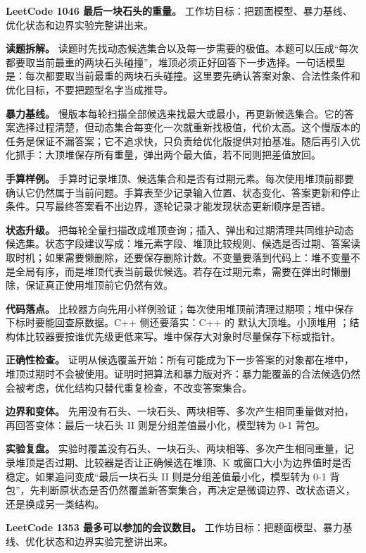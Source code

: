 \noindent\textbf{LeetCode 1046 最后一块石头的重量。} 工作坊目标：把题面模型、暴力基线、优化状态和边界实验完整讲出来。

\textbf{读题拆解。} 读题时先找动态候选集合以及每一步需要的极值。本题可以压成“每次都要取当前最重的两块石头碰撞”，堆顶必须正好回答下一步选择。一句话模型是：每次都要取当前最重的两块石头碰撞。这里要先确认答案对象、合法性条件和优化目标，不要把题型名字当成推导。

\textbf{暴力基线。} 慢版本每轮扫描全部候选来找最大或最小，再更新候选集合。它的答案选择过程清楚，但动态集合每变化一次就重新找极值，代价太高。这个慢版本的任务是保证不漏答案；它不追求快，只负责给优化版提供对拍基准。随后再引入优化抓手：大顶堆保存所有重量，弹出两个最大值，若不同则把差值放回。

\textbf{手算样例。} 手算时记录堆顶、候选集合和是否有过期元素。每次使用堆顶前都要确认它仍然属于当前问题。手算表至少记录输入位置、状态变化、答案更新和停止条件。只写最终答案看不出边界，逐轮记录才能发现状态更新顺序是否错。

\textbf{状态升级。} 把每轮全量扫描改成堆顶查询；插入、弹出和过期清理共同维护动态候选集。状态字段建议写成：堆元素字段、堆顶比较规则、候选是否过期、答案读取时机；如果需要懒删除，还要保存删除计数。不变量要落到代码上：堆不变量不是全局有序，而是堆顶代表当前最优候选。若存在过期元素，需要在弹出时懒删除，保证真正使用堆顶前它仍然有效。

\textbf{代码落点。} 比较器方向先用小样例验证；每次使用堆顶前清理过期项；堆中保存下标时要能回查原数据。C++ 侧还要落实：C++ 的  默认大顶堆。小顶堆用 ；结构体比较器要按谁优先级更低来写。堆中保存大对象时尽量保存下标或指针。

\textbf{正确性检查。} 证明从候选覆盖开始：所有可能成为下一步答案的对象都在堆中，堆顶过期时不会被使用。证明时把算法和暴力版对齐：暴力能覆盖的合法候选仍然会被考虑，优化结构只替代重复检查，不改变答案集合。

\textbf{边界和变体。} 先用没有石头、一块石头、两块相等、多次产生相同重量做对拍，再回答变体：最后一块石头 II 则是分组差值最小化，模型转为 0-1 背包。

\textbf{实验复盘。} 实验时覆盖没有石头、一块石头、两块相等、多次产生相同重量，记录堆顶是否过期、比较器是否让正确候选在堆顶、K 或窗口大小为边界值时是否稳定。如果追问变成“最后一块石头 II 则是分组差值最小化，模型转为 0-1 背包”，先判断原状态是否仍然覆盖新答案集合，再决定是微调边界、改状态语义，还是换成另一类结构。

\noindent\textbf{LeetCode 1353 最多可以参加的会议数目。} 工作坊目标：把题面模型、暴力基线、优化状态和边界实验完整讲出来。


